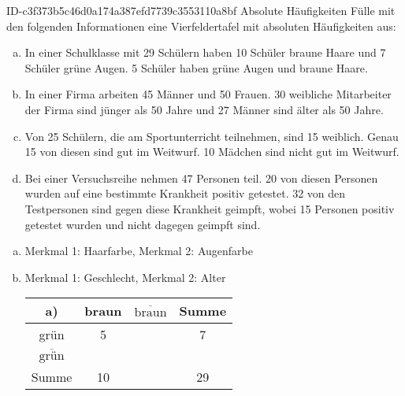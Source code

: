\begin{exercise}
      {ID-c3f373b5c46d0a174a387efd7739c3553110a8bf}
      {Absolute Häufigkeiten}
  \ifproblem\problem
    Fülle mit den folgenden Informationen eine Vierfeldertafel mit
    absoluten Häufigkeiten aus:
    \begin{enumerate}[a)]
      \item In einer Schulklasse mit 29 Schülern haben 10 Schüler braune Haare
            und 7 Schüler grüne Augen. 5 Schüler haben grüne Augen und braune Haare.
      \item In einer Firma arbeiten 45 Männer und 50 Frauen. 30 weibliche Mitarbeiter
            der Firma sind jünger als 50 Jahre und 27 Männer sind älter als 50 Jahre.
      \item Von 25 Schülern, die am Sportunterricht teilnehmen, sind 15 weiblich.
            Genau 15 von diesen sind gut im Weitwurf.
            10 Mädchen sind nicht gut im Weitwurf.
      \item Bei einer Versuchsreihe nehmen 47 Personen teil. 20 von diesen Personen
            wurden auf eine bestimmte Krankheit positiv getestet. 32 von den
            Testpersonen sind gegen diese Krankheit geimpft, wobei 15 Personen
            positiv getestet wurden und nicht dagegen geimpft sind.
    \end{enumerate}
  \fi
  \ifoutline\outline
    \begin{enumerate}[a)]
      \item Merkmal 1: Haarfarbe, Merkmal 2: Augenfarbe
      \item Merkmal 1: Geschlecht, Merkmal 2: Alter
        \begin{center}
          \begingroup
            \newcommand{\attribApos}{braun}%
            \newcommand{\attribAneg}{$\overline{\text{braun}}$}%
            \newcommand{\attribBpos}{grün}%
            \newcommand{\attribBneg}{$\overline{\text{grün}}$}%
            \renewcommand{\arraystretch}{1.25}%
            \begin{tabular}{|c||c|c||c|}
              \hline
              a)          & \attribApos & \attribAneg & Summe \\
              \hline
              \hline
              \attribBpos & 5           &             & 7     \\
              \hline
              \attribBneg &             &             &       \\
              \hline
              \hline
              Summe       & 10          &             & 29    \\

\end{tabular}
\end{center}
\end{enumerate}
\end{exercise}
